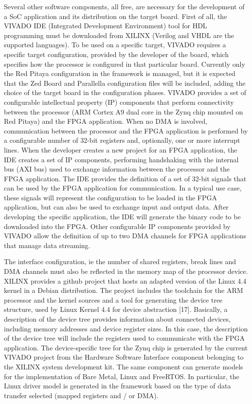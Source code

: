 Several other software components, all free, are necessary for the development of a SoC application and its distribution on the target board. First of all, the VIVADO IDE (Integrated Development Environment) tool for HDL programming must be downloaded from XILINX (Verilog and VHDL are the supported languages). To be used on a specific target, VIVADO requires a specific target configuration, provided by the developer of the board, which specifies how the processor is configured in that particular board. Currently only the Red Pitaya configuration in the framework is managed, but it is expected that the Zed Board and Parallella configuration files will be included, adding the choice of the target board in the configuration phases. VIVADO provides a set of configurable intellectual property (IP) components that perform connectivity between the processor (ARM Cortex A9 dual core in the Zynq chip mounted on Red Pitaya) and the FPGA application. When no DMA is involved, communication between the processor and the FPGA application is performed by a configurable number of 32-bit registers and, optionally, one or more interrupt lines. When the developer creates a new project for an FPGA application, the IDE creates a set of IP components, performing handshaking with the internal bus (AXI bus) used to exchange information between the processor and the FPGA application. The IDE provides the definition of a set of 32-bit signals that can be used by the FPGA application for communication. In a typical use case, these signals will represent the configuration to be loaded in the FPGA application, but can also be used to exchange input and output data. After developing the specific application, the IDE will generate the binary code to be downloaded into the FPGA. Other configurable IP components provided by VIVADO allow the definition of up to two DMA channels for FPGA applications that manage data streaming.

The interface configuration, ie the number of shared registers, break lines and DMA channels must also be reflected in the memory map of the processor device. XILINX provides a github project that hosts an adapted version of the Linux 4.4 kernel in a Debian distribution. The project includes the toolchain for the ARM processor and the kernel sources and a tool for generating the device tree structure, used by Linux Kernel 4.4 for device abstraction [17]. Basically, a description of the device tree provides information about connected devices, including memory addresses and device register sizes. In this case, the description of the device tree will include the registers used to communicate with the FPGA application. The device-specific tree for the Zynq chip is generated by the current VIVADO project from the Hardware Software Interface component belonging to the XILINX system development kit. The same component can generate models for the implementation of Bare Metal, Linux and FreeRTOS. In particular, the Linux driver model is generated in the framework based on the type of data transfer selected (mapped registers and / or DMA).


